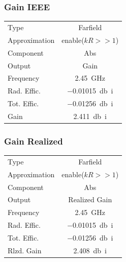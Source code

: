 \documentclass[Deriaz_Traiber_Labo02]{subfiles}
\begin{document}
\subsubsection{Gain IEEE}

\begin{table}[H]
\centering
\begin{tabular}{l c}\hline
Type				& Farfield\\
Approximation	& enable($kR>>1$)\\
Component		& Abs\\
Output			& Gain\\
Frequency		& \SI{2.45}{\giga\hertz}\\
Rad. Effic.		& \SI{-0.01015}{\decibel i}\\
Tot. Effic.		& \SI{-0.01256}{\decibel i}\\
Gain				& \SI{2.411}{\decibel i}\\\hline
\end{tabular}
\end{table}

\subsubsection{Gain Realized}

\begin{table}[H]
\centering
\begin{tabular}{l c}\hline
Type				& Farfield\\
Approximation	& enable($kR>>1$)\\
Component		& Abs\\
Output			& Realized Gain\\
Frequency		& \SI{2.45}{\giga\hertz}\\
Rad. Effic.		& \SI{-0.01015}{\decibel i}\\
Tot. Effic.		& \SI{-0.01256}{\decibel i}\\
Rlzd. Gain		& \SI{2.408}{\decibel i}\\\hline
\end{tabular}
\end{table}
\end{document}
